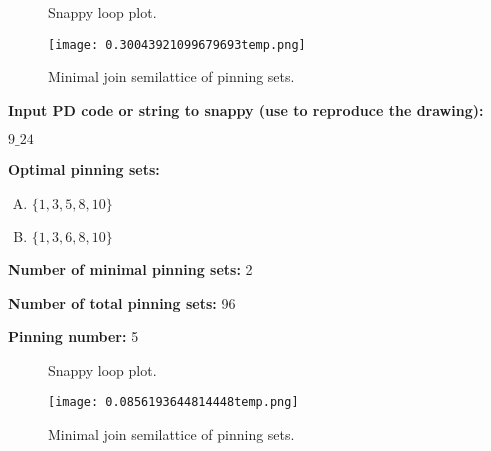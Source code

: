 \documentclass{article}%
\begin{document}
\begin{multicols}{2}
\begin{figure}[H]
\centering

\caption{Snappy loop plot.}
\label{fig:0.8084990316051008temp.svg}
\end{figure}\columnbreak

\begin{figure}[H]
\centering
\texttt{[image: 0.30043921099679693temp.png]}
\caption{Minimal join semilattice of pinning sets.}
\label{fig:0.30043921099679693temp.png}
\end{figure}\end{multicols}\newpage\begin{multicols}{2}

\columnbreak

\noindent\textbf{Input PD code or string to snappy (use to reproduce the drawing):}

	$9\_24$

\noindent\textbf{Optimal pinning sets:}

\begin{enumerate}[A)]
\item{\Huge\textcolor{red0}{\textbullet}}$\{1,3,5,8,10\}$

\item{\Huge\textcolor{red5}{\textbullet}}$\{1,3,6,8,10\}$

\end{enumerate}


\noindent\textbf{Number of minimal pinning sets:} 2

\noindent\textbf{Number of total pinning sets:} 96

\noindent\textbf{Pinning number:} 5


\end{multicols}

\begin{multicols}{2}
\begin{figure}[H]
\centering

\caption{Snappy loop plot.}
\label{fig:0.5957107665800648temp.svg}
\end{figure}\columnbreak

\begin{figure}[H]
\centering
\texttt{[image: 0.0856193644814448temp.png]}
\caption{Minimal join semilattice of pinning sets.}
\label{fig:0.0856193644814448temp.png}
\end{figure}\end{multicols}\newpage
\end{document}
